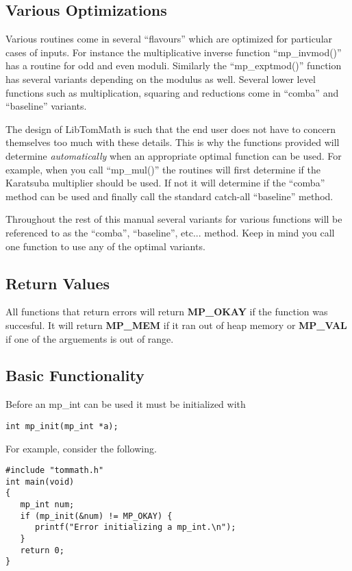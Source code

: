 \documentclass{article}
\begin{document}
\subsection{Various Optimizations}
Various routines come in several ``flavours'' which are optimized for particular cases of inputs.  For instance
the multiplicative inverse function ``mp\_invmod()'' has a routine for odd and even moduli.  Similarly the
``mp\_exptmod()'' function has several variants depending on the modulus as well.  Several lower level
functions such as multiplication, squaring and reductions come in ``comba'' and ``baseline'' variants.

The design of LibTomMath is such that the end user does not have to concern themselves too much with these
details.  This is why the functions provided will determine \textit{automatically} when an appropriate
optimal function can be used.  For example, when you call ``mp\_mul()'' the routines will first determine
if the Karatsuba multiplier should be used.  If not it will determine if the ``comba'' method can be used
and finally call the standard catch-all ``baseline'' method.

Throughout the rest of this manual several variants for various functions will be referenced to as
the ``comba'', ``baseline'', etc... method.  Keep in mind you call one function to use any of the optimal
variants.

\subsection{Return Values}
All functions that return errors will return \textbf{MP\_OKAY} if the function was succesful.  It will return 
\textbf{MP\_MEM} if it ran out of heap memory or \textbf{MP\_VAL} if one of the arguements is out of range.  

\subsection{Basic Functionality}
Before an mp\_int can be used it must be initialized with 

\begin{verbatim}
int mp_init(mp_int *a);
\end{verbatim}

For example, consider the following.

\begin{verbatim}
#include "tommath.h"
int main(void)
{
   mp_int num;
   if (mp_init(&num) != MP_OKAY) {
      printf("Error initializing a mp_int.\n");
   }
   return 0;
}   
\end{verbatim}
\end{document}
